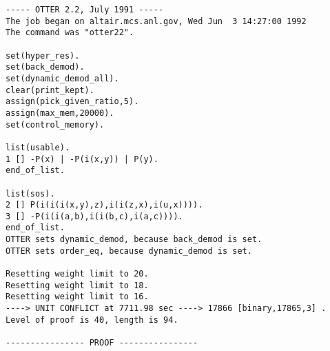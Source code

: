 {\small \begin{verbatim}
----- OTTER 2.2, July 1991 -----
The job began on altair.mcs.anl.gov, Wed Jun  3 14:27:00 1992
The command was "otter22".

set(hyper_res).
set(back_demod).
set(dynamic_demod_all).
clear(print_kept).
assign(pick_given_ratio,5).
assign(max_mem,20000).
set(control_memory).

list(usable).
1 [] -P(x) | -P(i(x,y)) | P(y).
end_of_list.

list(sos).
2 [] P(i(i(i(x,y),z),i(i(z,x),i(u,x)))).
3 [] -P(i(i(a,b),i(i(b,c),i(a,c)))).
end_of_list.
OTTER sets dynamic_demod, because back_demod is set.
OTTER sets order_eq, because dynamic_demod is set.

Resetting weight limit to 20.
Resetting weight limit to 18.
Resetting weight limit to 16.
----> UNIT CONFLICT at 7711.98 sec ----> 17866 [binary,17865,3] .
Level of proof is 40, length is 94.

---------------- PROOF ----------------


\end{verbatim}}
